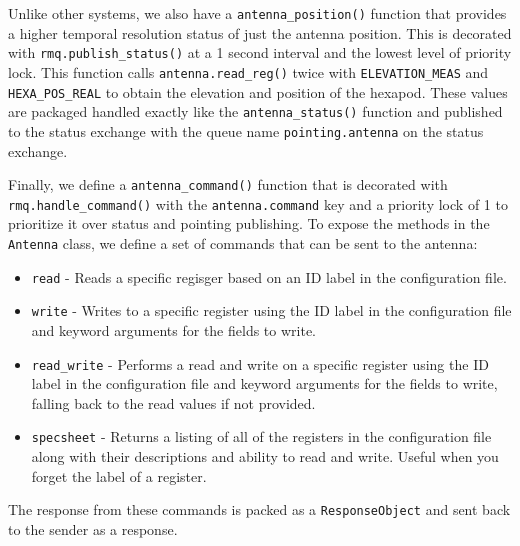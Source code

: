 Unlike other systems, we also have a \texttt{antenna\_position()} function that provides a higher temporal resolution status of just the antenna position.
This is decorated with \texttt{rmq.publish\_status()} at a 1 second interval and the lowest level of priority lock.
This function calls \texttt{antenna.read\_reg()} twice with \texttt{ELEVATION\_MEAS} and \texttt{HEXA\_POS\_REAL} to obtain the elevation and position of the hexapod. 
These values are packaged handled exactly like the \texttt{antenna\_status()} function and published to the status exchange with the queue name \texttt{pointing.antenna} on the status exchange.

Finally, we define a \texttt{antenna\_command()} function that is decorated with \texttt{rmq.handle\_command()} with the \texttt{antenna.command} key and a priority lock of 1 to prioritize it over status and pointing publishing. 
To expose the methods in the \texttt{Antenna} class, we define a set of commands that can be sent to the antenna: 
\begin{itemize}
    \item \texttt{read} - Reads a specific regisger based on an ID label in the configuration file.
    \item \texttt{write} - Writes to a specific register using the ID label in the configuration file and keyword arguments for the fields to write.
    \item \texttt{read\_write} - Performs a read and write on a specific register using the ID label in the configuration file and keyword arguments for the fields to write, falling back to the read values if not provided.
    \item \texttt{specsheet} - Returns a listing of all of the registers in the configuration file along with their descriptions and ability to read and write. Useful when you forget the label of a register.
\end{itemize}
The response from these commands is packed as a \texttt{ResponseObject} and sent back to the sender as a response.

